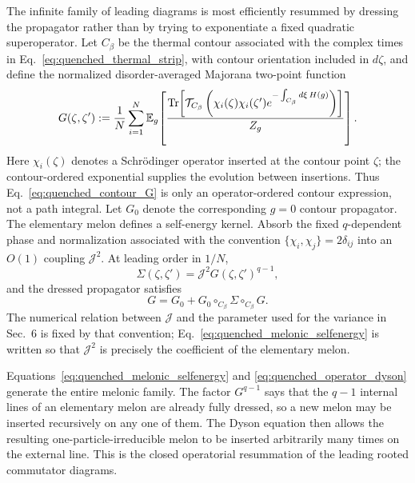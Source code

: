 \documentclass{article}
\theoremstyle{definition}
\begin{document}
The infinite family of leading diagrams is most efficiently resummed by dressing the propagator rather than by trying to exponentiate a fixed quadratic superoperator. Let $C_\beta$ be the thermal contour associated with the complex times in Eq.~\eqref{eq:quenched_thermal_strip}, with contour orientation included in $d\zeta$, and define the normalized disorder-averaged Majorana two-point function
\begin{equation}
    G(\zeta,\zeta')
    :=\frac{1}{N}\sum_{i=1}^N
    \mathbb E_g\!\left[
    \frac{
    \operatorname{Tr}\!\left[
        {\cal T}_{C_\beta}\left(
        \chi_i(\zeta)\chi_i(\zeta')
        e^{-\int_{C_\beta}d\xi\,H(g)}
        \right)
    \right]}{Z_g}
    \right].
    \label{eq:quenched_contour_G}
\end{equation}
Here $\chi_i(\zeta)$ denotes a Schr\"odinger operator inserted at the contour point $\zeta$; the contour-ordered exponential supplies the evolution between insertions. Thus Eq.~\eqref{eq:quenched_contour_G} is only an operator-ordered contour expression, not a path integral. Let $G_0$ denote the corresponding $g=0$ contour propagator. The elementary melon defines a self-energy kernel. Absorb the fixed $q$-dependent phase and normalization associated with the convention $\{\chi_i,\chi_j\}=2\delta_{ij}$ into an $O(1)$ coupling $\mathcal J^2$. At leading order in $1/N$,
\begin{equation}
    \Sigma(\zeta,\zeta')
    =\mathcal J^2 G(\zeta,\zeta')^{q-1},
    \label{eq:quenched_melonic_selfenergy}
\end{equation}
and the dressed propagator satisfies
\begin{equation}
    G
    =G_0+G_0\circ_{C_\beta}\Sigma\circ_{C_\beta}G.
    \label{eq:quenched_operator_dyson}
\end{equation}
The numerical relation between $\mathcal J$ and the parameter used for the variance in Sec.~6 is fixed by that convention; Eq.~\eqref{eq:quenched_melonic_selfenergy} is written so that $\mathcal J^2$ is precisely the coefficient of the elementary melon.

Equations~\eqref{eq:quenched_melonic_selfenergy} and \eqref{eq:quenched_operator_dyson} generate the entire melonic family. The factor $G^{q-1}$ says that the $q-1$ internal lines of an elementary melon are already fully dressed, so a new melon may be inserted recursively on any one of them. The Dyson equation then allows the resulting one-particle-irreducible melon to be inserted arbitrarily many times on the external line. This is the closed operatorial resummation of the leading rooted commutator diagrams.
\end{document}
